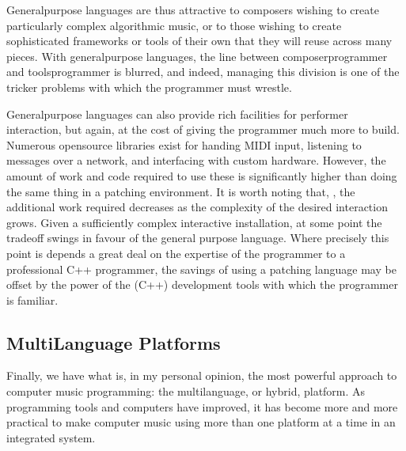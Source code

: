 \documentclass[letterpaper,10pt,english]{sphinxmanual}
\begin{document}
\sphinxAtStartPar
General\sphinxhyphen{}purpose languages are thus attractive to composers wishing
to create particularly complex algorithmic music, or to those wishing to create sophisticated
frameworks or tools of their own that they will reuse across many pieces.
With general\sphinxhyphen{}purpose languages, the line between composer\sphinxhyphen{}programmer and tools\sphinxhyphen{}programmer
is blurred, and indeed, managing this division is one of the tricker problems
with which the programmer must wrestle.

\sphinxAtStartPar
General\sphinxhyphen{}purpose languages can also provide rich facilities for
performer interaction, but again, at the cost of giving the programmer much more
to build. Numerous open\sphinxhyphen{}source libraries exist for handing MIDI input, listening to
messages over a network, and interfacing with custom hardware.
However, the amount of work and code required to use these is significantly
higher than doing the same thing in a patching environment.
It is worth noting that, , the additional work required decreases as the complexity
of the desired interaction grows. Given a sufficiently complex interactive
installation, at some point the trade\sphinxhyphen{}off swings in favour of the general
purpose language. Where precisely this point is depends a great deal
on the expertise of the programmer \sphinxhyphen{} to a professional C++ programmer, the
savings of using a patching language may be offset by the power of the
(C++) development tools with which the programmer is familiar.


\subsection{Multi\sphinxhyphen{}Language Platforms}
\label{\detokenize{background:multi-language-platforms}}
\sphinxAtStartPar
Finally, we have what is, in my personal opinion, the most powerful approach to computer music programming:
the multi\sphinxhyphen{}language, or hybrid, platform.
As programming tools and computers have improved, it has become more and more practical to make computer
music using more than one platform at a time in an integrated system.
\end{document}
